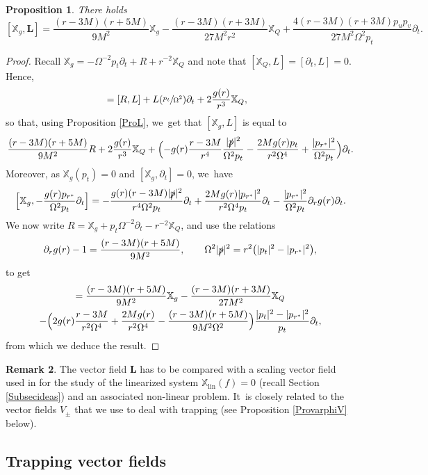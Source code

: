 \documentclass[10pt]{amsart}
\theoremstyle{plain}
\newtheorem{proposition}{Proposition}[section]
\theoremstyle{definition}
\newtheorem{remark}[proposition]{Remark}
\newcommand\T{{\mathbb{X}}}
\begin{document}
\begin{proposition}\label{ProbarY}
There holds
\[
[\T_g,\pmb{L}] = \frac{(r-3M)(r+5M)}{9M^2}\T_g-\frac{(r-3M)(r+3M)}{27M^2r^2}\T_Q+\frac{4(r-3M)(r+3M)p_u p_v}{27M^2 \Omega^2p_t} \partial_t.
\]
\end{proposition}
\begin{proof}
Recall $\T_g=-\Omega^{-2}p_t\partial_t+R+r^{-2}\T_Q$ and note that $[\T_Q,L]=[\partial_t,L]=0$. Hence,
\begin{align*}
[\T_g,L] & = [R,L]+L(\sfrac{p_t}{\Omega^2})\partial_t+2\frac{g(r)}{r^3} \T_Q,
\end{align*}
so that, using Proposition \ref{ProL}, we~get that $[\T_g,L]$ is equal to
\[
\frac{(r-3M)(r+5M)}{9M^2}R+2\frac{g(r)}{r^3}\T_Q+\Bigl(-g(r)\frac{r-3M}{r^4}\frac{|\slashed{p}|^2}{\Omega^2 p_t}-\frac{2Mg(r)p_t}{r^2\Omega^4}+\frac{|p_{r^*}|^2}{\Omega^2p_t}\Bigr) \partial_t.
\]
Moreover, as $\T_g(p_t)=0$ and $[\T_g, \partial_t]=0$, we~have
\[
\Bigl[ \T_g, -\frac{g(r)p_{r^*}}{\Omega^2p_t} \partial_t \Bigr] = -\frac{g(r)(r-3M)|\slashed{p}|^2}{r^4\Omega^2p_t} \partial_t +\frac{2Mg(r)|p_{r^*}|^2}{r^2\Omega^4p_t} \partial_t-\frac{|p_{r^*}|^2}{ \Omega^2 p_t} \partial_r g(r) \partial_t.
\]
We now write $R=\T_g+p_t \Omega^{-2} \partial_t-r^{-2} \T_Q$, and use the relations
\[
\partial_r g(r)-1=\frac{(r-3M)(r+5M)}{9M^2},\qquad \Omega^2 |\slashed{p}|^2=r^2 \bigl(|p_t|^2-|p_{r^*}|^2 \bigr),
\]
to get
\begin{multline*}
[\T_g,\pmb{L}] = \frac{(r-3M)(r+5M)}{9M^2}\T_g-\frac{(r-3M)(r+3M)}{27M^2}\T_Q\\
-\Bigl(2g(r)\frac{r-3M}{r^2 \Omega^4} +\frac{2Mg(r)}{r^2\Omega^4}-\frac{(r-3M)(r+5M)}{9M^2 \Omega^2} \Bigr)\frac{|p_t|^2-|p_{r^*}|^2}{p_t} \partial_t,
\end{multline*}
from which we deduce the result.
\end{proof}

\begin{remark}
The vector field $\pmb{L}$ has to be compared with a scaling vector field used in \cite{VV24} for the study of the linearized system $\mathbb{X}_{\mathrm{lin}}(f)=0$ (recall Section \ref{Subsecideas}) and an associated non-linear problem. It~is closely related to the vector fields $V_{\pm}$ that we use to deal with trapping (see Proposition \ref{ProvarphiV} below).
\end{remark}

\subsection{Trapping vector fields}\label{SubsecVminus}
\end{document}
